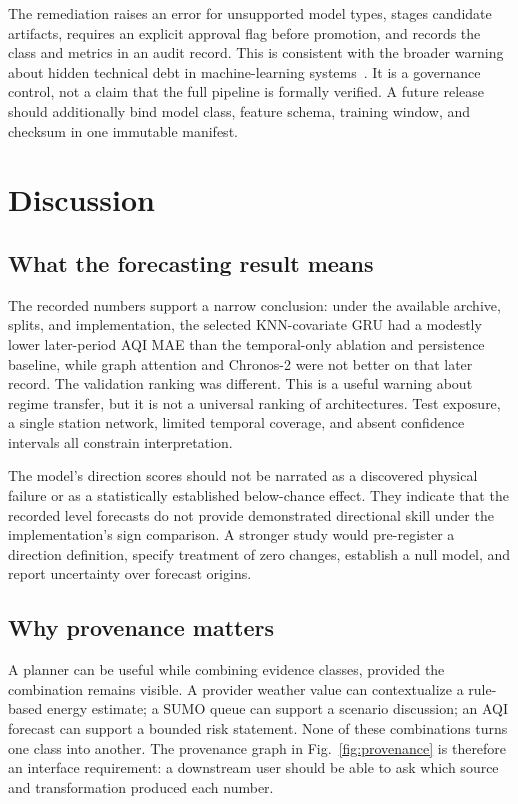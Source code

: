 \documentclass[conference]{IEEEtran}
\begin{document}
The remediation raises an error for unsupported model types, stages candidate artifacts, requires an explicit approval flag before promotion, and records the class and metrics in an audit record. This is consistent with the broader warning about hidden technical debt in machine-learning systems~\cite{sculley2015debt}. It is a governance control, not a claim that the full pipeline is formally verified. A future release should additionally bind model class, feature schema, training window, and checksum in one immutable manifest.

\section{Discussion}
\subsection{What the forecasting result means}
The recorded numbers support a narrow conclusion: under the available archive, splits, and implementation, the selected KNN-covariate GRU had a modestly lower later-period AQI MAE than the temporal-only ablation and persistence baseline, while graph attention and Chronos-2 were not better on that later record. The validation ranking was different. This is a useful warning about regime transfer, but it is not a universal ranking of architectures. Test exposure, a single station network, limited temporal coverage, and absent confidence intervals all constrain interpretation.

The model's direction scores should not be narrated as a discovered physical failure or as a statistically established below-chance effect. They indicate that the recorded level forecasts do not provide demonstrated directional skill under the implementation's sign comparison. A stronger study would pre-register a direction definition, specify treatment of zero changes, establish a null model, and report uncertainty over forecast origins.

\subsection{Why provenance matters}
A planner can be useful while combining evidence classes, provided the combination remains visible. A provider weather value can contextualize a rule-based energy estimate; a SUMO queue can support a scenario discussion; an AQI forecast can support a bounded risk statement. None of these combinations turns one class into another. The provenance graph in Fig.~\ref{fig:provenance} is therefore an interface requirement: a downstream user should be able to ask which source and transformation produced each number.
\end{document}
